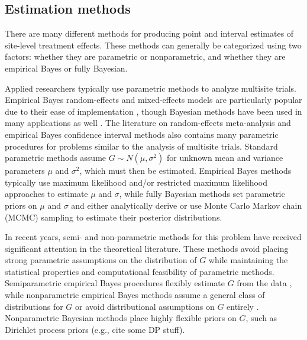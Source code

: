 \documentclass[]{article}
\begin{document}
\subsection{Estimation methods}

There are many different methods for producing point and interval estimates of site-level treatment effects.
These methods can generally be categorized using two factors: whether they are parametric or nonparametric, and whether they are empirical Bayes or fully Bayesian.

Applied researchers typically use parametric methods to analyze multisite trials.
Empirical Bayes random-effects and mixed-effects models are particularly popular due to their ease of implementation \citep{bloom2017using}, though Bayesian methods have been used in many applications as well \citep{rubin1981estimation}.
The literature on random-effects meta-analysis \citep{higgins2009re} and empirical Bayes confidence interval methods \citep{morris1983parametric, he1992parametric, gene2009empirical} also contains many parametric procedures for problems similar to the analysis of multisite trials.
Standard parametric methods assume $G \sim N(\mu, \sigma^2)$ for unknown mean and variance parameters $\mu$ and $\sigma^2$, which must then be estimated.
Empirical Bayes methods typically use maximum likelihood and/or restricted maximum likelihood approaches to estimate $\mu$ and $\sigma$, while fully Bayesian methods set parametric priors on $\mu$ and $\sigma$ and either analytically derive or use Monte Carlo Markov chain (MCMC) sampling to estimate their posterior distributions.

In recent years, semi- and non-parametric methods for this problem have received significant attention in the theoretical literature.
These methods avoid placing strong parametric assumptions on the distribution of $G$ while maintaining the statistical properties and computational feasibility of parametric methods.
Semiparametric empirical Bayes procedures flexibly estimate $G$ from the data \citep{laird1987empirical, yu2018adaptive}, while nonparametric empirical Bayes methods assume a general class of distributions for $G$ \citep{ignatiadis2022confidence} or avoid distributional assumptions on $G$ entirely \citep{armstrong2020robust}.
Nonparametric Bayesian methods place highly flexible priors on $G$, such as Dirichlet process priors (e.g., cite some DP stuff).
\end{document}
